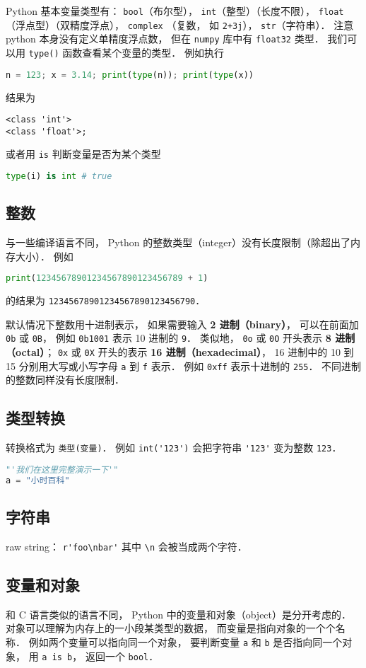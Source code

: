 
\begin{issues}
\issueDraft
\end{issues}


Python 基本变量类型有： \verb|bool|（布尔型）， \verb|int|（整型）（长度不限）， \verb|float|（浮点型）（双精度浮点）， \verb|complex| （复数， 如 \verb|2+3j|）， \verb|str|（字符串）． 注意 python 本身没有定义单精度浮点数， 但在 \verb|numpy| 库中有 \verb|float32| 类型． 我们可以用 \verb|type()| 函数查看某个变量的类型． 例如执行
\begin{lstlisting}[language=python]
n = 123; x = 3.14; print(type(n)); print(type(x))
\end{lstlisting}
结果为
\begin{lstlisting}
<class 'int'>
<class 'float'>;
\end{lstlisting}
或者用 \verb|is| 判断变量是否为某个类型
\begin{lstlisting}[language=python]
type(i) is int # true
\end{lstlisting}

\subsection{整数}
与一些编译语言不同， Python 的整数类型（integer）没有长度限制（除超出了内存大小）． 例如
\begin{lstlisting}[language=python]
print(12345678901234567890123456789 + 1)
\end{lstlisting}
的结果为 \verb|12345678901234567890123456790|．

默认情况下整数用十进制表示， 如果需要输入 \textbf{2 进制（binary）}， 可以在前面加 \verb|0b| 或 \verb|0B|， 例如 \verb|0b1001| 表示 10 进制的 \verb|9|． 类似地， \verb|0o| 或 \verb|0O| 开头表示 \textbf{8 进制（octal）}； \verb|0x| 或 \verb|0X| 开头的表示 \textbf{16 进制（hexadecimal）}， 16 进制中的 10 到 15 分别用大写或小写字母 \verb|a| 到 \verb|f| 表示． 例如 \verb|0xff| 表示十进制的 \verb|255|． 不同进制的整数同样没有长度限制．

\subsection{类型转换}
转换格式为 \verb|类型(变量)|． 例如 \verb|int('123')| 会把字符串 \verb|'123'| 变为整数 \verb|123|．
\begin{lstlisting}[language=python]
"'我们在这里完整演示一下'"
a = "小时百科"
\end{lstlisting}
\subsection{字符串}
raw string： \verb|r'foo\nbar'| 其中 \verb|\n| 会被当成两个字符．

\subsection{变量和对象}
和 C 语言类似的语言不同， Python 中的变量和对象（object）是分开考虑的． 对象可以理解为内存上的一小段某类型的数据， 而变量是指向对象的一个个名称． 例如两个变量可以指向同一个对象， 要判断变量 \verb|a| 和 \verb|b| 是否指向同一个对象， 用 \verb|a is b|， 返回一个 \verb|bool|．
